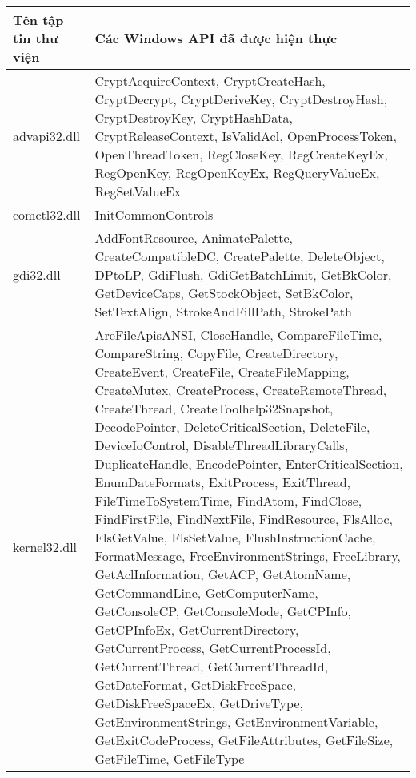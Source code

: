 \begin{longtable}[H]{ | m{3.5cm} | m{10cm} | }

\hline
	Tên tập tin thư viện & Các Windows API đã được hiện thực\\
\hline
\hline

advapi32.dll &
CryptAcquireContext, CryptCreateHash, CryptDecrypt, CryptDeriveKey, CryptDestroyHash, CryptDestroyKey, CryptHashData, CryptReleaseContext, IsValidAcl, OpenProcessToken, OpenThreadToken, RegCloseKey, RegCreateKeyEx, RegOpenKey, RegOpenKeyEx, RegQueryValueEx, RegSetValueEx \\
\hline
comctl32.dll &
InitCommonControls \\
\hline
gdi32.dll &
AddFontResource, AnimatePalette, CreateCompatibleDC, CreatePalette, DeleteObject, DPtoLP, GdiFlush, GdiGetBatchLimit, GetBkColor, GetDeviceCaps, GetStockObject, SetBkColor, SetTextAlign, StrokeAndFillPath, StrokePath \\
\hline
kernel32.dll &
AreFileApisANSI, CloseHandle, CompareFileTime, CompareString, CopyFile, CreateDirectory, CreateEvent, CreateFile, CreateFileMapping, CreateMutex, CreateProcess, CreateRemoteThread, CreateThread, CreateToolhelp32Snapshot, DecodePointer, DeleteCriticalSection, DeleteFile, DeviceIoControl, DisableThreadLibraryCalls, DuplicateHandle, EncodePointer, EnterCriticalSection, EnumDateFormats, ExitProcess, ExitThread, FileTimeToSystemTime, FindAtom, FindClose, FindFirstFile, FindNextFile, FindResource, FlsAlloc, FlsGetValue, FlsSetValue, FlushInstructionCache, FormatMessage, FreeEnvironmentStrings, FreeLibrary, GetAclInformation, GetACP, GetAtomName, GetCommandLine, GetComputerName, GetConsoleCP, GetConsoleMode, GetCPInfo, GetCPInfoEx, GetCurrentDirectory, GetCurrentProcess, GetCurrentProcessId, GetCurrentThread, GetCurrentThreadId, GetDateFormat, GetDiskFreeSpace, GetDiskFreeSpaceEx, GetDriveType, GetEnvironmentStrings, GetEnvironmentVariable, GetExitCodeProcess, GetFileAttributes, GetFileSize, GetFileTime, GetFileType \\


\end{longtable}
